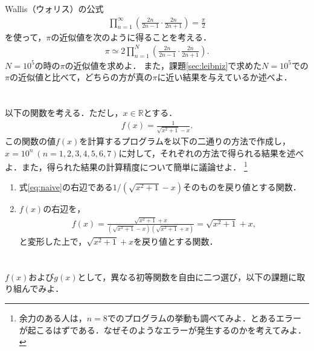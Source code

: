 \documentclass[a4paper,12pt]{jsarticle}
\begin{document}
Wallis（ウォリス）の公式
\begin{align}
    \prod_{n=1}^{\infty}
    \left(
        \frac{2n}{2n-1}
        \cdot
        \frac{2n}{2n+1}
    \right)
    =
    \frac{\pi}{2}
\end{align}
を使って，$\pi$の近似値を次のように得ることを考える．
\begin{align}
    \pi
    \simeq
    2\prod_{n=1}^{N}
    \left(
        \frac{2n}{2n-1}
        \cdot
        \frac{2n}{2n+1}
    \right).
\end{align}
$N=10^{5}$の時の$\pi$の近似値を求めよ．
また，課題\ref{sec:leibniz}で求めた$N=10^{5}$での$\pi$の近似値と比べて，どちらの方が真の$\pi$に近い結果を与えているか述べよ．



\section{}
\label{sec:err_reduction}

以下の関数を考える．ただし，$x\in\mathbb{R}$とする．
\begin{align}
\label{eq:naive}
    f(x)
    =
    \frac{1}{\sqrt{x^{2}+1}-x}.
\end{align}
この関数の値$f(x)$を計算するプログラムを以下の二通りの方法で作成し，$x=10^{n}~(n=1,2,3,4,5,6,7)$に対して，それぞれの方法で得られる結果を述べよ．また，得られた結果の計算精度について簡単に議論せよ．
\footnote{余力のある人は，$n=8$でのプログラムの挙動も調べてみよ．とあるエラーが起こるはずである．なぜそのようなエラーが発生するのかを考えてみよ．}

\begin{enumerate}
    \item 式\eqref{eq:naive}の右辺である$1/(\sqrt{x^{2}+1}-x)$そのものを戻り値とする関数．
    \item $f(x)$の右辺を，
    \begin{align}
        f(x)
        =
        \frac{\sqrt{x^{2}+1}+x}{(\sqrt{x^{2}+1}-x)(\sqrt{x^{2}+1}+x)}
        =
        \sqrt{x^{2}+1}+x,
    \end{align}
    と変形した上で，$\sqrt{x^{2}+1}+x$を戻り値とする関数．\\
\end{enumerate}

\section{}
\label{sec:taylor}

$f(x)$および$g(x)$として，異なる初等関数を自由に二つ選び，以下の課題に取り組んでみよ．\\
\end{document}
